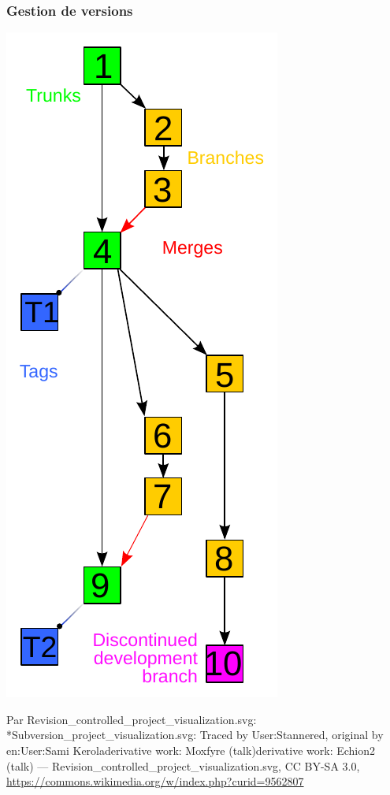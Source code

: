 \documentclass[table,tikz,12pt,svgnames]{beamer}
\begin{document}
\begin{frame}
	\frametitle{Gestion de versions}
	\vspace{-2em}
	\begin{block}{}
    \begin{adjustwidth}{-5.5cm}{}
		\begin{center}
		{\includegraphics[scale=0.58]{images/gestion_versions.pdf}}
		\end{center}
	\end{adjustwidth}
	\vspace{-4em}
    \begin{adjustwidth}{5.0cm}{}
	\tiny Par Revision\_controlled\_project\_visualization.svg: *Subversion\_project\_visualization.svg: Traced by User:Stannered, original by en:User:Sami Keroladerivative work: Moxfyre (talk)derivative work: Echion2 (talk) — Revision\_controlled\_project\_visualization.svg, CC BY-SA 3.0, \url{https://commons.wikimedia.org/w/index.php?curid=9562807}
	\end{adjustwidth}
	\end{block}
\end{frame}
\end{document}
